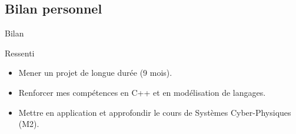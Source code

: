 \subsection{Bilan personnel}

\begin{frame}{Bilan}

\begin{block}{Ressenti}

\begin{itemize}
    \item Mener un projet de longue durée (9 mois).
    \item Renforcer mes compétences en C++ et en modélisation de langages.
    \item Mettre en application et approfondir le cours de Systèmes Cyber-Physiques (M2).
\end{itemize}\textbf{}
    
\end{block}
    
\end{frame}
